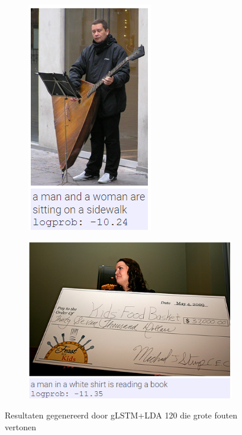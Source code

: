 \begin{figure}
\begin{subfigure}{.5\textwidth}
			\includegraphics[width=.8\linewidth]{Images/Results/Bad/sitting_sidewalk}
			\label{fig:badresults5}
		\end{subfigure}%
		\begin{subfigure}{.5\textwidth}
			\centering
			\includegraphics[width=.8\linewidth]{Images/Results/Bad/book}
			\label{fig:badresults6}
		\end{subfigure}
		
		\caption{Resultaten gegenereerd door gLSTM+LDA 120 die grote fouten vertonen}
		\label{fig:badresults}
	\end{figure}

